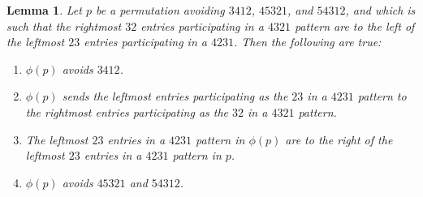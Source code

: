 \documentclass[10pt,a4paper]{amsart}
\newtheorem{lemma}{Lemma}
\begin{document}
\begin{lemma}
    Let $p$ be a permutation avoiding $3412$, $45321$, and $54312$, and which is such that the rightmost $32$ entries participating in a $4321$ pattern are to the left of the leftmost $23$ entries participating in a $4231$. Then the following are true:
    \begin{enumerate}
        \item $\phi(p)$ avoids $3412$.
        \item $\phi(p)$ sends the leftmost entries participating as the $23$ in a $4231$ pattern to the rightmost entries participating as the $32$ in a $4321$ pattern.
        \item The leftmost $23$ entries in a $4231$ pattern in $\phi(p)$ are to the right of the leftmost $23$ entries in a $4231$ pattern in $p$.
        \item $\phi(p)$ avoids $45321$ and $54312$.
    \end{enumerate}
\end{lemma}
\end{document}
